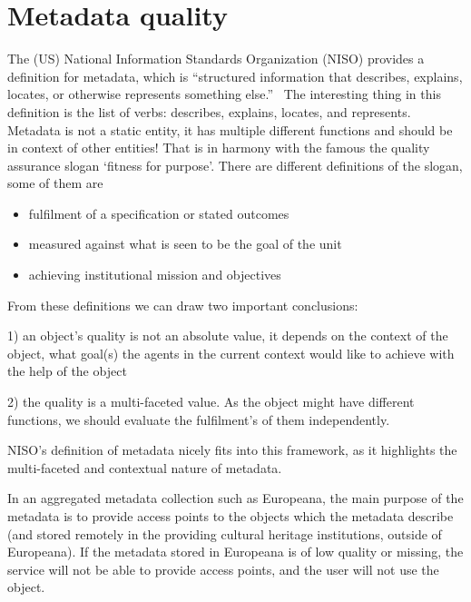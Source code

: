 \section{Metadata quality}


The (US) National Information Standards Organization (NISO) provides a definition for metadata, which is ``structured information that describes, explains, locates, or otherwise represents something else.''~\cite{framework2007} The interesting thing in this definition is the list of verbs: describes, explains, locates, and represents. Metadata is not a static entity, it has multiple different functions and should be in context of other entities! That is in harmony with the famous the quality assurance slogan `fitness for purpose'. There are different definitions of the slogan, some of them are

\begin{itemize}
 \setlength{\parskip}{0pt}
 \setlength{\itemsep}{0pt plus 1pt}
 \item fulfilment of a specification or stated outcomes
 \item measured against what is seen to be the goal of the unit
 \item achieving institutional mission and objectives
\end{itemize}

From these definitions we can draw two important conclusions:

1) an object's quality is not an absolute value, it depends on the context of the object, what goal(s) the agents in the current context would like to achieve with the help of the object

2) the quality is a multi-faceted value. As the object might have different functions, we should evaluate the fulfilment's of them independently.

NISO's definition of metadata nicely fits into this framework, as it highlights the multi-faceted and contextual nature of metadata.

In an aggregated metadata collection such as Europeana, the main purpose of the metadata is to provide access points to the objects which the metadata describe (and stored remotely in the providing cultural heritage institutions, outside of Europeana). If the metadata stored in Europeana is of low quality or missing, the service will not be able to provide access points, and the user will not use the object.

